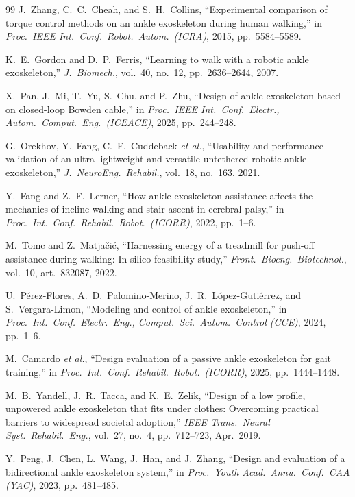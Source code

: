 \documentclass[conference]{IEEEtran}
\begin{document}
\begin{thebibliography}{99}
 J.~Zhang, C.~C.~Cheah, and S.~H.~Collins, ``Experimental comparison of torque control methods on an ankle exoskeleton during human walking,'' in \emph{Proc.~IEEE Int.~Conf.~Robot.~Autom.~(ICRA)}, 2015, pp.~5584--5589.

 K.~E.~Gordon and D.~P.~Ferris, ``Learning to walk with a robotic ankle exoskeleton,'' \emph{J.~Biomech.}, vol.~40, no.~12, pp.~2636--2644, 2007.

 X.~Pan, J.~Mi, T.~Yu, S.~Chu, and P.~Zhu, ``Design of ankle exoskeleton based on closed-loop Bowden cable,'' in \emph{Proc.~IEEE Int.~Conf.~Electr., Autom.~Comput.~Eng.~(ICEACE)}, 2025, pp.~244--248.

 G.~Orekhov, Y.~Fang, C.~F.~Cuddeback \emph{et al.}, ``Usability and performance validation of an ultra-lightweight and versatile untethered robotic ankle exoskeleton,'' \emph{J.~NeuroEng.~Rehabil.}, vol.~18, no.~163, 2021.

 Y.~Fang and Z.~F.~Lerner, ``How ankle exoskeleton assistance affects the mechanics of incline walking and stair ascent in cerebral palsy,'' in \emph{Proc.~Int.~Conf.~Rehabil.~Robot.~(ICORR)}, 2022, pp.~1--6.

 M.~Tomc and Z.~Matja\v{c}i\'c, ``Harnessing energy of a treadmill for push-off assistance during walking: In-silico feasibility study,'' \emph{Front.~Bioeng.~Biotechnol.}, vol.~10, art.~832087, 2022.

 U.~P\'erez-Flores, A.~D.~Palomino-Merino, J.~R.~L\'opez-Guti\'errez, and S.~Vergara-Limon, ``Modeling and control of ankle exoskeleton,'' in \emph{Proc.~Int.~Conf.~Electr.~Eng., Comput.~Sci.~Autom.~Control (CCE)}, 2024, pp.~1--6.

 M.~Camardo \emph{et al.}, ``Design evaluation of a passive ankle exoskeleton for gait training,'' in \emph{Proc.~Int.~Conf.~Rehabil.~Robot.~(ICORR)}, 2025, pp.~1444--1448.

 M.~B.~Yandell, J.~R.~Tacca, and K.~E.~Zelik, ``Design of a low profile, unpowered ankle exoskeleton that fits under clothes: Overcoming practical barriers to widespread societal adoption,'' \emph{IEEE Trans.~Neural Syst.~Rehabil.~Eng.}, vol.~27, no.~4, pp.~712--723, Apr.~2019.

 Y.~Peng, J.~Chen, L.~Wang, J.~Han, and J.~Zhang, ``Design and evaluation of a bidirectional ankle exoskeleton system,'' in \emph{Proc.~Youth Acad.~Annu.~Conf.~CAA (YAC)}, 2023, pp.~481--485.


\end{thebibliography}
\end{document}
